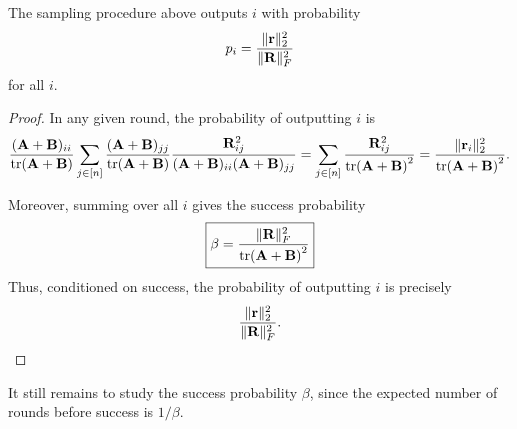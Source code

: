 \documentclass{article}
\begin{document}
\begin{lemma}
    The sampling procedure above outputs $i$ with probability 
    \[p_i = \frac{\|\mathbf{r}\|^2_2}{\|\mathbf{R}\|^2_F}\]
    for all $i$.
\end{lemma}
\begin{proof}
    In any given round, the probability of outputting $i$ is 
    \[\frac{(\mathbf{A} + \mathbf{B})_{ii}}{\tr(\mathbf{A} + \mathbf{B})}\sum_{j\in [n]}\frac{(\mathbf{A} + \mathbf{B})_{jj}}{\tr(\mathbf{A} + \mathbf{B})}\frac{\mathbf{R}_{ij}^2}{(\mathbf{A}+\mathbf{B})_{ii}(\mathbf{A}+\mathbf{B})_{jj}} = \sum_{j\in [n]}\frac{\mathbf{R}_{ij}^2}{\tr(\mathbf{A} + \mathbf{B})^2} = \frac{\|\mathbf{r}_i\|^2_2}{\tr(\mathbf{A} + \mathbf{B})^2}.\]

    Moreover, summing over all $i$ gives the success probability 
    \[\boxed{\beta = \frac{\|\mathbf{R}\|^2_F}{\tr(\mathbf{A} + \mathbf{B})^2}}\]
    Thus, conditioned on success, the probability of outputting $i$ is precisely 
    \[\frac{\|\mathbf{r}\|^2_2}{\|\mathbf{R}\|^2_F}.\]
\end{proof}

\noindent
It still remains to study the success probability $\beta$, since the expected number of rounds before success is $1/\beta$.
\end{document}
